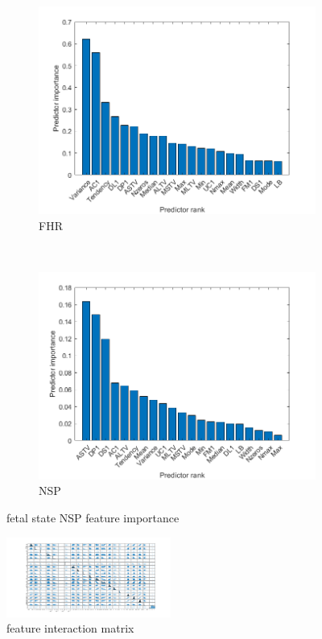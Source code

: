 \documentclass[11pt,a4paper]{article}
\begin{document}
\begin{figure}[htb]
  \centering
  \begin{subfigure}[b]{0.48\textwidth}
    \centering
    \includegraphics[width=\textwidth]{figures/feature_importance.png}
    \caption{FHR}
  \end{subfigure}
  ~
  \begin{subfigure}[b]{0.48\textwidth}
    \centering
    \includegraphics[width=\textwidth]{figures/feature_importance_NSP.png}
    \caption{NSP}
  \end{subfigure}
  \caption{fetal state NSP feature importance}
  \label{fig:FI}
\end{figure}

\begin{figure}[htb]
  \centering
    \centering
    \includegraphics[width=0.48\textwidth]{figures/plotmatrix_X.png}
    \caption{feature interaction matrix}
  \label{fig:plotmatrixX}
\end{figure}
\end{document}
